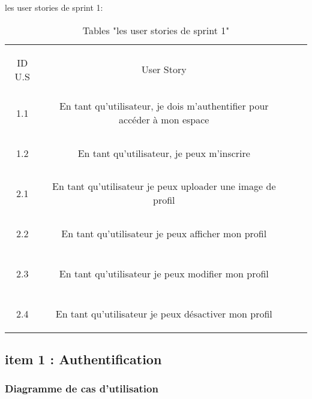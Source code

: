 
\begin{table}[h]
	{\Large \color{cyan} les user stories de sprint 1:}\\
	
	\begin{center}
		\begin{tabular}{>{\begin{bf} } c <{\end{bf}}ccc}
			
			\rowcolor{-blue!20!red}ID U.S & \begin{bf}User Story \end{bf}  & \\
			
			
			1.1  & En tant qu’utilisateur, je dois m’authentifier pour accéder à mon espace \\& \\
			1.2  & En tant qu’utilisateur, je peux m’inscrire \\& \\
			2.1 & En tant qu’utilisateur je peux uploader une image de profil \\& \\
			2.2  & En tant qu’utilisateur je peux afficher mon profil \\& \\
			2.3  & En tant qu’utilisateur je peux modifier mon profil \\& \\
			2.4 & En tant qu’utilisateur je peux désactiver mon profil \\
			
			
		\end{tabular}
	\end{center}
	\caption{Tables  "les user stories de sprint 1"}
	\label{les user stories de sprint 1}
\end{table}
		

\clearpage

\subsection{item 1 : Authentification}
\subsubsection{Diagramme de cas d’utilisation }


